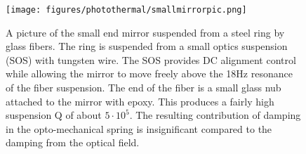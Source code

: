 \begin{figure}[ht]
\texttt{[image: figures/photothermal/smallmirrorpic.png]}%
\caption{A picture of the small end mirror suspended from a steel ring by glass fibers. The ring is suspended from a small optics suspension (SOS) with tungsten wire.
The SOS provides DC alignment control while allowing the mirror to move freely above the 18Hz resonance of the fiber suspension. The end of the fiber is a small glass nub attached to the mirror with epoxy. This produces a fairly high suspension Q of about $5 \cdot 10^5$. The resulting contribution of damping in the opto-mechanical spring is insignificant compared to the damping from the optical field.}%
\label{fig:smallmirrorpic}%
\end{figure}





